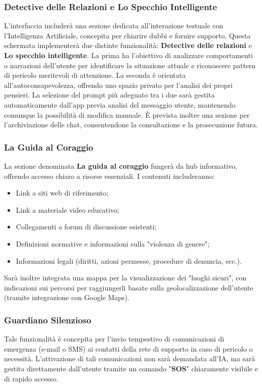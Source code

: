 \documentclass[a4paper,12pt]{article}
\begin{document}
\subsubsection{Detective delle Relazioni e Lo Specchio Intelligente}
L'interfaccia includerà una sezione dedicata all'interazione testuale con l'Intelligenza Artificiale, concepita per chiarire dubbi e fornire supporto. Questa schermata implementerà due distinte funzionalità: \textbf{Detective delle relazioni} e \textbf{Lo specchio intelligente}.
La prima ha l'obiettivo di analizzare comportamenti o narrazioni dell'utente per identificare la situazione attuale e riconoscere pattern di pericolo meritevoli di attenzione. La seconda è orientata all'autoconsapevolezza, offrendo uno spazio privato per l'analisi dei propri pensieri.
La selezione del prompt più adeguato tra i due sarà gestita automaticamente dall'app previa analisi del messaggio utente, mantenendo comunque la possibilità di modifica manuale. È prevista inoltre una sezione per l'archiviazione delle chat, consentendone la consultazione e la prosecuzione futura.

\subsubsection{La Guida al Coraggio}
La sezione denominata \textbf{La guida al coraggio} fungerà da hub informativo, offrendo accesso chiaro a risorse essenziali. I contenuti includeranno:
\begin{itemize}
    \item Link a siti web di riferimento;
    \item Link a materiale video educativo;
    \item Collegamenti a forum di discussione esistenti;
    \item Definizioni normative e informazioni sulla "violenza di genere";
    \item Informazioni legali (diritti, azioni permesse, procedure di denuncia, ecc.).
\end{itemize}
Sarà inoltre integrata una mappa per la visualizzazione dei "luoghi sicuri", con indicazioni sui percorsi per raggiungerli basate sulla geolocalizzazione dell'utente (tramite integrazione con Google Maps).

\subsubsection{Guardiano Silenzioso}
Tale funzionalità è concepita per l'invio tempestivo di comunicazioni di emergenza (e-mail o SMS) ai contatti della rete di supporto in caso di pericolo o necessità. L'attivazione di tali comunicazioni non sarà demandata all'IA, ma sarà gestita direttamente dall'utente tramite un comando "\textbf{SOS}" chiaramente visibile e di rapido accesso.
\end{document}
